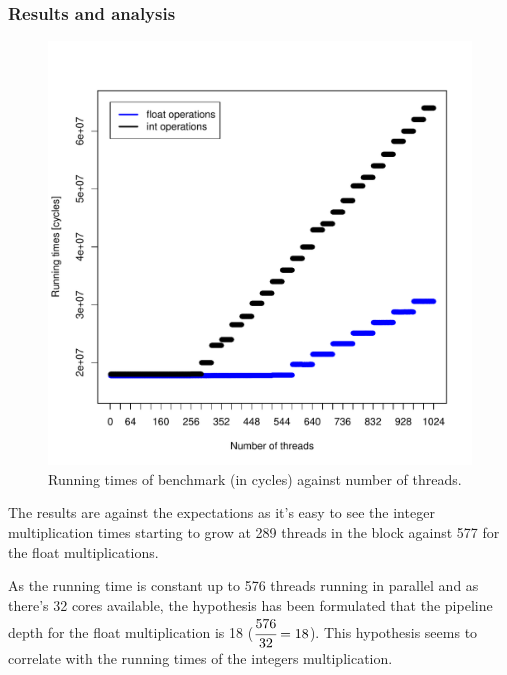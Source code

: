 \documentclass{report}
\def \scalingfactor{.8}
\begin{document}
	\subsubsection{Results and analysis}
    \begin{figure}[H]
    	\centering
	    \includegraphics[width=\scalingfactor\linewidth]{"graphics/float_vs_int_running_times"}
		\vspace{-15pt}
		\captionsetup{justification=centering}
        \caption{Running times of benchmark (in cycles) against number of threads.}
    \end{figure}
	
    The results are against the expectations as it's easy to see the integer
    multiplication times starting to grow at 289 threads in the block against
    577 for the float multiplications.
    
    As the running time is constant up to 576 threads running in parallel and as there's 32 cores
    available, the hypothesis has been formulated that the pipeline depth for the float multiplication is 18 ($\cfrac{576}{32} = 18$). 
    This hypothesis seems to correlate with the running times of the integers multiplication. 
    
\end{document}
